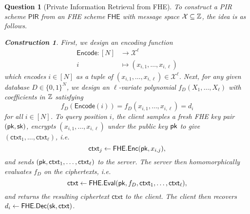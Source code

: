 \documentclass[10pt,twoside]{article}
\theoremstyle{sltheorem}
\newtheorem*{construction*}{Construction}
\newtheorem{question}{Question}
\newcommand{\ctxt}{\mathsf{ctxt}}
\newcommand{\cX}{\mathcal{X}}
\newcommand{\bits}[1][]{\{0,1\}^{#1}}
\begin{document}
\begin{question}[Private Information Retrieval from FHE]
    To construct a PIR scheme $\mathsf{PIR}$ from an FHE scheme $\mathsf{FHE}$ with message space $\cX \subseteq \ZZ$, the idea is as follows.

    \begin{construction*}
        First, we design an encoding function 
        \begin{align*}
            \mathsf{Encode}: [N] &\to \cX^\ell \\
            i &\mapsto (x_{i,1}, \ldots, x_{i,\ell})
        \end{align*}
        which encodes $i \in [N]$ as a tuple of $(x_{i,1}, \ldots, x_{i,\ell}) \in \cX^\ell$.
        Next, for any given database $D \in \bits[N]$, we design an $\ell$-variate polynomial $f_D(X_1,\ldots,X_\ell)$ with coefficients in $\mathbb{Z}$ satisfying 
        \[f_D(\mathsf{Encode}(i)) = f_D(x_{i,1}, \ldots, x_{i,\ell}) = d_i\]
        for all $i \in [N]$.
        To query position $i$, the client samples a fresh FHE key pair $(\pk,\sk)$, encrypts $(x_{i,1}, \ldots, x_{i,\ell})$ under the public key $\pk$ to give $(\ctxt_1,\ldots,\ctxt_\ell)$, i.e.
        \[\ctxt_j \gets \mathsf{FHE}.\enc(\pk, x_{i,j}),\] 
        and sends $(\pk, \ctxt_1, \ldots, \ctxt_\ell)$ to the server.
        The server then homomorphically evaluates $f_D$ on the ciphertexts, i.e.
        \[\ctxt \gets \mathsf{FHE}.\eval(\pk, f_D, \ctxt_1, \ldots, \ctxt_\ell),\]
        and returns the resulting ciphertext $\ctxt$ to the client.
        The client then recovers $d_i \gets \mathsf{FHE}.\dec(\sk, \ctxt)$.
    \end{construction*}
    


\end{question}
\end{document}
